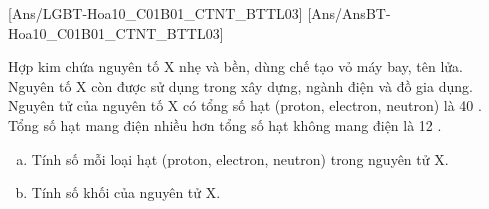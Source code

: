 [Ans/LGBT-Hoa10_C01B01_CTNT_BTTL03]
[Ans/AnsBT-Hoa10_C01B01_CTNT_BTTL03]
\begin{bt}
	Hợp kim chứa nguyên tố $\mathrm{X}$ nhẹ và bền, dùng chế tạo vỏ máy bay, tên lửa. Nguyên tố $\mathrm{X}$ còn được sử dụng trong xây dựng, ngành điện và đồ gia dụng. Nguyên tử của nguyên tố $\mathrm{X}$ có tổng số hạt (proton, electron, neutron) là 40 . Tổng số hạt mang điện nhiều hơn tổng số hạt không mang điện là 12 .
	\begin{enumerate}[a)]
		\item Tính số mỗi loại hạt (proton, electron, neutron) trong nguyên tử $\mathrm{X}$.
		\item Tính số khối của nguyên tử $\mathrm{X}$.
	\end{enumerate}
\end{bt}
